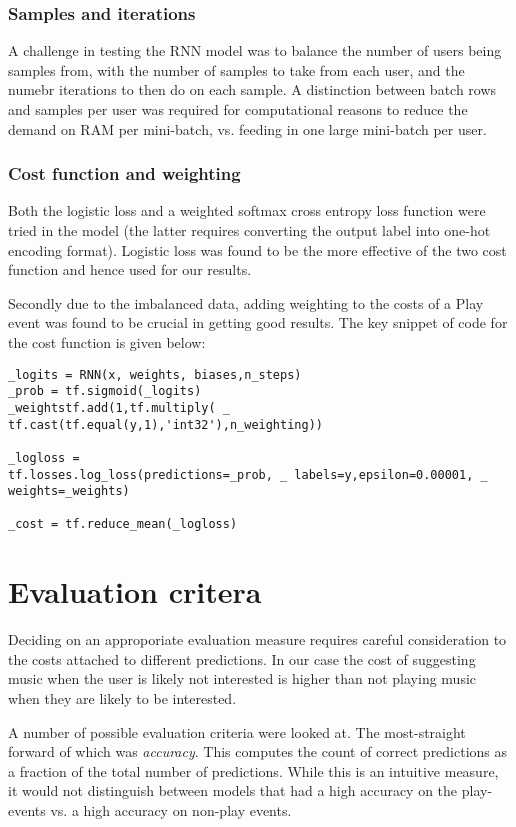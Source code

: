 \subsubsection{Samples and iterations}

A challenge in testing the RNN model was to balance the number of users being samples from, with the number of samples to take from each user, and the numebr iterations to then do on each sample. A distinction between batch rows and samples per user was required for computational reasons to reduce the demand on RAM per mini-batch, vs. feeding in one large mini-batch per user.

\subsubsection{Cost function and weighting}

Both the logistic loss and a weighted softmax cross entropy loss function were tried in the model (the latter requires converting the output label into one-hot encoding format). Logistic loss was found to be the more effective of the two cost function and hence used for our results. 

Secondly due to the imbalanced data, adding weighting to the costs of a Play event was found to be crucial in getting good results. The key snippet of code for the cost function is given below:

\begin{lstlisting}
_logits = RNN(x, weights, biases,n_steps)
_prob = tf.sigmoid(_logits)
_weightstf.add(1,tf.multiply( _
tf.cast(tf.equal(y,1),'int32'),n_weighting))

_logloss =
tf.losses.log_loss(predictions=_prob, _ labels=y,epsilon=0.00001, _ 
weights=_weights)

_cost = tf.reduce_mean(_logloss)
\end{lstlisting}


\section{Evaluation critera}

Deciding on an approporiate evaluation measure requires careful consideration to the costs attached to different predictions. In our case the cost of suggesting music when the user is likely not interested is higher than not playing music when they are likely to be interested. 

A number of possible evaluation criteria were looked at. The most-straight forward of which was \textit{accuracy}. This computes the count of correct predictions as a fraction of the total number of predictions. While this is an intuitive measure, it would not distinguish between models that had a high accuracy on the play-events vs. a high accuracy on non-play events. 

